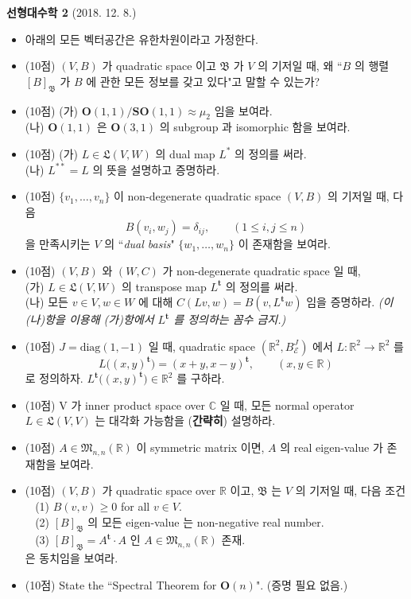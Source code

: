 \documentclass[12pt]{report}
\newcommand{\numl}[1]{\item[\textbf{#1}]}
\newcommand{\mf}[1]{\mathfrak{#1}}
\newcommand{\mc}[1]{\mathcal{#1}}
\newcommand{\bb}[1]{\mathbb{#1}}
\newcommand{\rmbf}[1]{\mathrm{\mathbf{#1}}}
\newcommand{\trans}{^{\mathrm{\mathbf{t}}}}
\newcommand{\diag}{\text{diag}}
\begin{document}
\begin{center}
\textbf{\large 선형대수학 2} (2018. 12. 8.)
\end{center}

\begin{itemize}
\numl{0.} 아래의 모든 벡터공간은 유한차원이라고 가정한다.

\numl{1.} (10점) $(V, B)$ 가 quadratic space 이고 $\mf{B}$ 가 $V$ 의 기저일 때, 왜 ``$B$ 의 행렬 $[B]_\mf{B}$ 가 $B$ 에 관한 모든 정보를 갖고 있다"고 말할 수 있는가?
 
\numl{2.} (10점) (가) $\rmbf{O}(1, 1) / \rmbf{SO}(1, 1) \approx \mu_2$ 임을 보여라.\\
(나) $\rmbf{O}(1, 1)$ 은 $\rmbf{O}(3, 1)$ 의 subgroup 과 isomorphic 함을 보여라.
 
\numl{3.} (10점) (가) $L\in \mf{L}(V, W)$ 의 dual map $L^\ast$ 의 정의를 써라.\\
(나) $L^{\ast \ast} = L$ 의 뜻을 설명하고 증명하라.

\numl{4.} (10점) $\{v_1, \dots, v_n\}$ 이 non-degenerate quadratic space $(V, B)$ 의 기저일 때, 다음 $$B(v_i, w_j) = \delta_{ij}, \qquad (1\leq i, j\leq n)$$ 을 만족시키는 $V$ 의 ``\textit{dual basis}" $\{w_1, \dots, w_n\}$ 이 존재함을 보여라.

\numl{5.} (10점) $(V, B)$ 와 $(W, C)$ 가 non-degenerate quadratic space 일 때,\\
(가) $L\in \mf{L}(V, W)$ 의 transpose map $L\trans$ 의 정의를 써라.\\
(나) 모든 $v\in V, w\in W$ 에 대해 $C(Lv, w) = B(v, L\trans w)$ 임을 증명하라. \textit{(이 (나)항을 이용해 (가)항에서 $L\trans$ 를 정의하는 꼼수 금지.)}

\numl{6.} (10점) $J = \diag(1, -1)$ 일 때, quadratic space $\left(\bb{R}^2, B_\mc{E}^J\right)$ 에서 $L:\bb{R}^2\rightarrow \bb{R}^2$ 를 $$L\big((x, y)\trans\big) = (x+y, x-y)\trans, \qquad (x, y\in \bb{R})$$
로 정의하자. $L\trans\big((x, y)\trans\big) \in \bb{R}^2$ 를 구하라.

\numl{7.} (10점) V 가 inner product space over $\bb{C}$ 일 때, 모든 normal operator $L\in \mf{L}(V, V)$ 는 대각화 가능함을 (\textbf{간략히}) 설명하라.

\numl{8.} (10점) $A\in \mf{M}_{n, n}(\bb{R})$ 이 symmetric matrix 이면, $A$ 의 real eigen-value 가 존재함을 보여라.

\numl{9.} (10점) $(V, B)$ 가 quadratic space over $\bb{R}$ 이고, $\mf{B}$ 는 $V$ 의 기저일 때, 다음 조건\\
$~~~~$(1) $B(v, v)\geq 0$ for all $v\in V$.\\
$~~~~$(2) $[B]_\mf{B}$ 의 모든 eigen-value 는 non-negative real number.\\
$~~~~$(3) $[B]_\mf{B} = A\trans\cdot A$ 인 $A\in \mf{M}_{n, n}(\bb{R})$ 존재.\\
은 동치임을 보여라.

\numl{10.} (10점) State the ``Spectral Theorem for $\rmbf{O}(n)$". (증명 필요 없음.)


\end{itemize}
\end{document}
